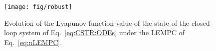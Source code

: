 \documentclass[letterpaper, 10pt, conference]{ieeeconf}
\begin{document}
 





  \begin{figure}[!htbp]
  	\centering
  	\texttt{[image: fig/robust]}
  	\vspace{-8pt}
  	\caption{Evolution of the Lyapunov function value of the state of the closed-loop system of Eq.~\ref{eq:CSTR:ODEs} under the LEMPC of Eq.~\ref{eq:nLEMPC}.}
  \label{fig:robust}
  	\vspace{-6pt}
  \end{figure}
\end{document}
